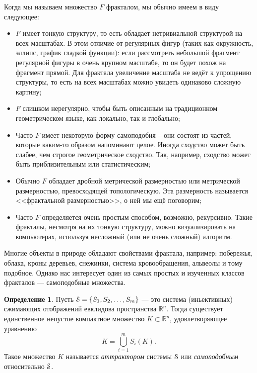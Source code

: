 \documentclass[a4paper,14pt]{extarticle} %
\newcommand{\eS}{\EuScript{S}}
\newcommand{\IN}{\subset}
\newcommand{\rr}{\mathbb{R}}
\newcommand{\0}{\varnothing}
\newcommand{\8}{\infty}
\theoremstyle{definition}
\newtheorem{definition}[theorem]{Определение}
\begin{document}
Когда мы называем множество $F$ фракталом, мы обычно имеем в
виду следующее:
\begin{itemize}
    \item $F$ имеет тонкую структуру, то есть обладает нетривиальной структурой на всех масштабах. В этом отличие от регулярных фигур (таких как окружность, эллипс, график гладкой функции): если рассмотреть небольшой фрагмент регулярной фигуры в очень крупном масштабе, то он будет похож на фрагмент прямой. Для фрактала увеличение масштаба не ведёт к упрощению структуры, то есть на всех масштабах можно увидеть одинаково сложную картину;
    \item $F$ слишком нерегулярно, чтобы быть описанным на традиционном геометрическом языке, как локально, так и глобально;
    \item Часто $F$ имеет некоторую форму самоподобия – они состоят из частей, которые каким-то образом напоминают целое. Иногда сходство может быть слабее, чем строгое геометрическое сходство. Так, например, сходство может быть приблизительным или статистическим;
    \item Обычно $F$ обладает дробной метрической размерностью или метрической размерностью, превосходящей топологическую. Эта размерность называется <<фрактальной размерностью>>, о ней мы ещё поговорим;
    \item Часто $F$ определяется очень простым способом, возможно, рекурсивно. Такие фракталы, несмотря на их тонкую структуру, можно визуализировать на компьютерах, используя несложный (или не очень сложный) алгоритм.
\end{itemize}

Многие объекты в природе обладают свойствами фрактала, например: побережья, облака, кроны деревьев, снежинки, система кровообращения, альвеолы и тому подобное.
Однако нас интересует один из самых простых и изученных классов фракталов --- самоподобные множества.


\begin{definition} \label{def:sss}
Пусть $\eS=\{S_1, S_2, \ldots, S_m\}$ --- это система (иньективных) сжимающих отображений евклидова пространства $\rr^n$.
Тогда существует единственное непустое компактное множество $K\IN\rr^n$, удовлетворяющее уравнению 
$$K = \bigcup \limits_{i = 1}^m S_i (K).$$ 
Такое множество $K$ называется {\em аттрактором} системы $\eS$ или {\em самоподобным} относительно $\eS$.
\end{definition}
\end{document}
